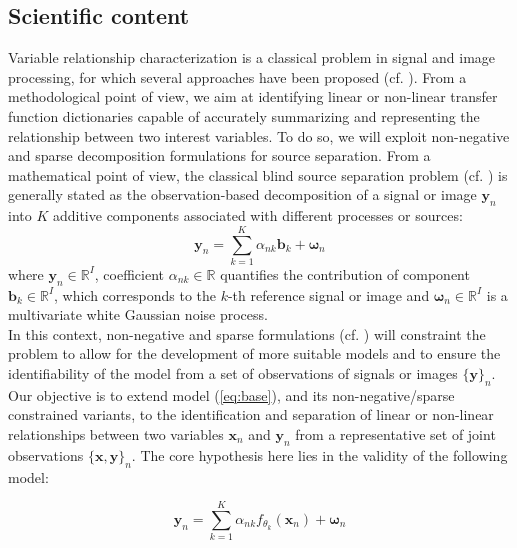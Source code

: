 \documentclass[10pt]{extarticle}
\begin{document}
\subsection*{Scientific content}
Variable relationship characterization is a classical problem in signal and image processing, for which several approaches %
have been proposed (cf. \cite{BSS,latent,tandeo}). 
From a methodological point of view, we aim at identifying linear or non-linear transfer function dictionaries capable of accurately summarizing and representing the relationship between two interest variables. To do so, we will exploit non-negative and sparse decomposition formulations for source separation. %
From a mathematical point of view, the classical blind source separation problem (cf. \cite{BSS}) is generally stated as the observation-based decomposition of a signal or image $\mathbf{y}_n$ into $K$ additive components associated with different processes or sources:
\begin{equation}
\mathbf{y}_n=\sum_{k=1}^K\alpha_{nk}\boldsymbol{b}_k+\boldsymbol\omega_n
\label{eq:base}
\end{equation}
where $\mathbf{y}_n \in \mathbb{R}^{I}$, coefficient $\alpha_{nk} \in \mathbb{R}$ quantifies the contribution of component $\boldsymbol{b}_k \in \mathbb{R}^{I}$, which corresponds to the $k$-th reference signal or image and $\boldsymbol\omega_n \in \mathbb{R}^{I}$ is a multivariate white Gaussian noise process.\\
In this context, non-negative and sparse formulations (cf. \cite{parts, fevotte, ozerov, sparse}) will constraint the problem to allow for the development of more suitable models and to ensure the identifiability of the model from a set of observations of signals or images $\{\mathbf{y}\}_n$. \\
Our objective is to extend model (\ref{eq:base}), and its non-negative/sparse constrained variants, to the identification and separation of linear or non-linear relationships between two variables $\mathbf{x}_n$ and $\mathbf{y}_n$ from a representative set of joint observations $\{\mathbf{x},\mathbf{y}\}_n$. The core hypothesis here lies in the validity of the following model:

\begin{equation}
\mathbf{y}_n=\sum_{k=1}^K\alpha_{nk}f_{\theta_k}(\mathbf{x}_n)+\boldsymbol\omega_n
\label{eq:general}
\end{equation}
\end{document}
